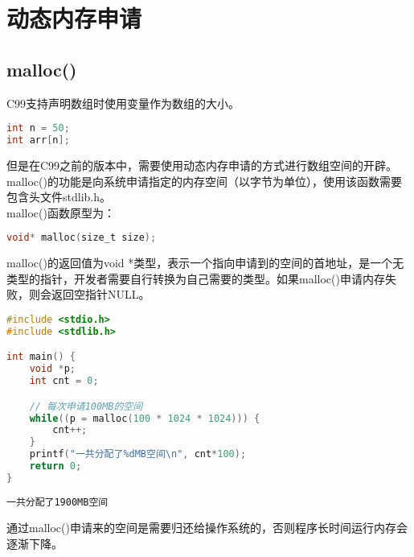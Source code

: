 \newpage

\section{动态内存申请}

\subsection{malloc()}

C99支持声明数组时使用变量作为数组的大小。

\vspace{-0.5cm}

\begin{lstlisting}[language=C]
int n = 50;
int arr[n];
\end{lstlisting}

但是在C99之前的版本中，需要使用动态内存申请的方式进行数组空间的开辟。malloc()的功能是向系统申请指定的内存空间（以字节为单位），使用该函数需要包含头文件stdlib.h。\\

malloc()函数原型为：

\vspace{-0.5cm}

\begin{lstlisting}[language=C]
void* malloc(size_t size);
\end{lstlisting}

malloc()的返回值为void *类型，表示一个指向申请到的空间的首地址，是一个无类型的指针，开发者需要自行转换为自己需要的类型。如果malloc()申请内存失败，则会返回空指针NULL。\\


\begin{lstlisting}[language=C]
#include <stdio.h>
#include <stdlib.h>

int main() {
    void *p;
    int cnt = 0;

    // 每次申请100MB的空间
    while((p = malloc(100 * 1024 * 1024))) {
        cnt++;
    }
    printf("一共分配了%dMB空间\n", cnt*100);
    return 0;
}
\end{lstlisting}

\begin{tcolorbox}
    \begin{verbatim}
一共分配了1900MB空间
	\end{verbatim}
\end{tcolorbox}

通过malloc()申请来的空间是需要归还给操作系统的，否则程序长时间运行内存会逐渐下降。\\

